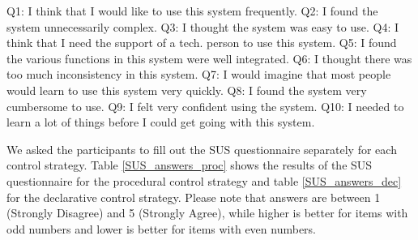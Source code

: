 \documentclass[10pt, conference]{IEEEtran}
\begin{document}
Q1: I think that I would like to use this system frequently.
Q2: I found the system unnecessarily complex.
Q3: I thought the system was easy to use.
Q4: I think that I need the support of a tech. person to use this system.
Q5: I found the various functions in this system were well integrated.
Q6: I thought there was too much inconsistency in this system.
Q7: I would imagine that most people would learn to use this system very quickly.
Q8: I found the system very cumbersome to use.
Q9: I felt very confident using the system.
Q10: I needed to learn a lot of things before I could get going with this system.

We asked the participants to fill out the SUS questionnaire separately for each control strategy. Table \ref{SUS_answers_proc} shows the results of the SUS questionnaire for the procedural control strategy and table \ref{SUS_answers_dec} for the declarative control strategy. Please note that answers are between 1 (Strongly Disagree) and 5 (Strongly Agree), while higher is better for items with odd numbers and lower is better for items with even numbers.
\end{document}
